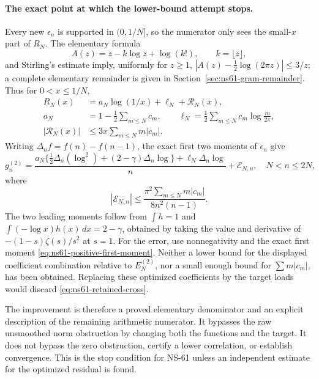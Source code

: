 \documentclass[11pt]{article}
\theoremstyle{remark}
\begin{document}
\paragraph{The exact point at which the lower-bound attempt stops.}
Every new $\epsilon_n$ is supported in $(0,1/N]$, so the numerator
only sees the small-$x$ part of $R_N$. The elementary formula
\[
 A(z)=z-k\log z+\log(k!),\qquad k=\lfloor z\rfloor,
\]
and Stirling's estimate imply, uniformly for $z\geq1$,
$|A(z)-\tfrac12\log(2\pi z)|\leq3/z$; a complete elementary
remainder is given in Section~\ref{sec:ns61-gram-remainder}.
Thus for $0<x\leq1/N$,
\begin{equation}
 \begin{aligned}
 R_N(x)&=a_N\log(1/x)+\ell_N+\mathcal R_N(x),\\
 a_N&=1-\tfrac12\sum_{m\leq N}c_m,\qquad
 \ell_N=\tfrac12\sum_{m\leq N}c_m\log\frac m{2\pi},\\
 |\mathcal R_N(x)|&\leq3x\sum_{m\leq N}m|c_m|.
 \end{aligned}
 \label{eq:ns61-residual-endpoint}
\end{equation}
Writing $\Delta_n f=f(n)-f(n-1)$, the exact first two moments of
$\epsilon_n$ give
\begin{equation}
 g_n^{(2)}=
 \frac{a_N\{\tfrac12\Delta_n(\log^2)+(2-\gamma)\Delta_n\log\}
              +\ell_N\Delta_n\log}{n}
 +\mathcal E_{N,n},
 \quad N<n\leq2N,
 \label{eq:ns61-endpoint-correlation}
\end{equation}
where
\[
 |\mathcal E_{N,n}|\leq
       \frac{\pi^2\sum_{m\leq N}m|c_m|}{8n^2(n-1)}.
\]
The two leading moments follow from $\int h=1$ and
$\int(-\log x)h(x)\,dx=2-\gamma$, obtained by taking the value
and derivative of $-(1-s)\zeta(s)/s^2$ at $s=1$.
For the error, use nonnegativity and the exact first moment
\eqref{eq:ns61-positive-first-moment}. Neither a lower bound for the displayed
coefficient combination relative to $E_N^{(2)}$, nor a small enough
bound for $\sum m|c_m|$, has been obtained. Replacing these optimized
coefficients by the target loads would discard
\eqref{eq:ns61-retained-cross}.

The improvement is therefore a proved elementary denominator and an
explicit description of the remaining arithmetic numerator. It bypasses
the raw unsmoothed norm obstruction by changing both the functions and
the target. It does not bypass the zero obstruction, certify a lower
correlation, or establish convergence. This is the stop condition for
NS-61 unless an independent estimate for the optimized residual is found.
\end{document}
